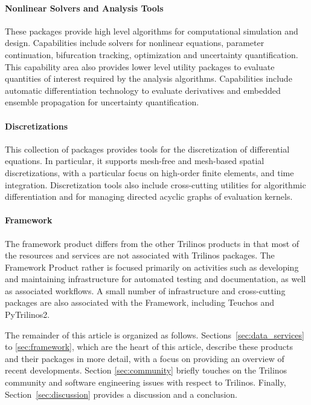 \paragraph{Nonlinear Solvers and Analysis Tools} These packages provide high level algorithms for computational simulation and design. Capabilities include solvers for nonlinear equations, parameter continuation, bifurcation tracking, optimization and uncertainty quantification. This capability area also provides lower level utility packages to evaluate quantities of interest required by the analysis algorithms. Capabilities include automatic differentiation technology to evaluate derivatives and embedded ensemble propagation for uncertainty quantification.

\paragraph{Discretizations} This collection of packages provides tools for the discretization of differential equations. In particular, it supports mesh-free and mesh-based spatial discretizations, with a particular focus on high-order finite elements, and time integration. Discretization tools also include cross-cutting utilities for algorithmic differentiation and for managing directed acyclic graphs of evaluation kernels.

\paragraph{Framework} The framework product differs from the other Trilinos products in that most of the resources and services are not associated with Trilinos packages. The Framework Product rather is focused primarily on activities such as developing and maintaining infrastructure for automated testing and documentation, as well as associated workflows. A small number of infrastructure and cross-cutting packages are also associated with the Framework, including Teuchos and PyTrilinos2.

The remainder of this article is organized as follows. Sections~\ref{sec:data_services} to \ref{sec:framework}, which are the heart of this article, describe these products and their packages in more detail, with a focus on providing an overview of recent developments. Section \ref{sec:community} briefly touches on the Trilinos community and software engineering issues with respect to Trilinos. Finally, Section~\ref{sec:discussion} provides a discussion and a conclusion.

